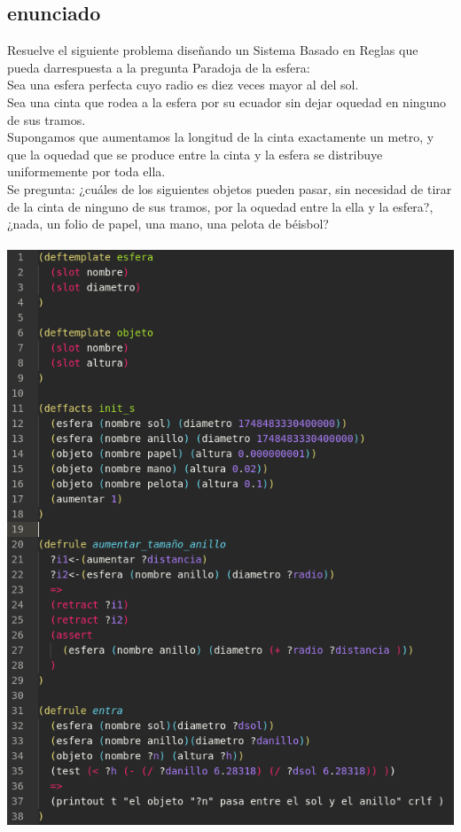 \documentclass[a4paper,10pt]{article}
\begin{document}
\subsection{enunciado}
Resuelve el siguiente problema diseñando un Sistema Basado en Reglas que pueda darrespuesta a la pregunta Paradoja de la esfera:\\
Sea una esfera perfecta cuyo radio es diez veces mayor al del sol.\\
Sea una cinta que rodea a la esfera por su ecuador sin dejar oquedad en ninguno de sus tramos.\\
Supongamos que aumentamos la longitud de la cinta exactamente un metro, y que
la oquedad que se produce entre la cinta y la esfera se distribuye uniformemente por toda ella.\\
Se pregunta: ¿cuáles de los siguientes objetos pueden pasar, sin necesidad de tirar de la cinta de ninguno de sus tramos, por la oquedad entre la ella y la esfera?, ¿nada, un folio de papel, una mano, una pelota de béisbol?\\
\vspace{0.5cm}\\
\includegraphics[scale=0.45]{code.png}




\end{document}
